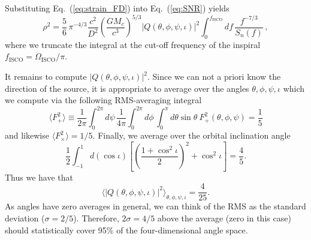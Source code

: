 \documentclass[prd,amsmath,amssymb,aps,floats,amsfonts,notitlepage,superscriptaddress,eqsecnum,nofootinbib,10pt]{revtex4-1}
\newcommand{\f}{\frac}
\newcommand{\be}{\begin{equation}}
\newcommand{\ee}{\end{equation}}
\begin{document}
Substituting Eq.~(\ref{eq:strain_FD}) into Eq.~(\ref{eq:SNR}) yields
%
\be
\rho^2 = \f{5}{6}\, \pi^{-4/3} \f{c^2}{D^2}\left(\f{G M_c}{c^3}\right)^{5/3}|Q(\theta,\phi,\psi,\iota)|^2 \int_0^{f_\text{ISCO}} d f\, \f{f^{-7/3}}{S_n(f)}\, \label{eq:SNR_v2},
\ee
%
where we truncate the integral at the cut-off frequency of the inspiral $f_\text{ISCO}=\Omega_\text{ISCO}/\pi$.

It remains to compute $|Q(\theta,\phi,\psi,\iota)|^2$. 
Since we can not a priori know the direction of the source, it is appropriate to average over the angles $\theta,\phi,\psi,\iota$ which we compute
%
%
via the following RMS-averaging integral
%
\be
\langle F^2_{+}\rangle \equiv \f{1}{2\pi}\int_0^{2\pi}d\psi \,\f{1}{4\pi}\int_0^{2\pi} d\phi\,\int_0^\pi d\theta \sin\theta\ F^2_{+}(\theta,\phi,\psi)=\f{1}{5}\label{eq:ang_av}
\ee
%
and likewise $\langle F^2_{\times}\rangle=1/5 $.
Finally, we average over the orbital inclination angle
%
\be
\f{1}{2} \int_{-1}^1 d(\cos\iota)\left[\left(\f{1+\cos^2\iota}{2}\right)^2+\cos^2\iota\right] = \f{4}{5} .\label{eq:inc_ang_av}
\ee
Thus we have that
%
\be
\langle |Q(\theta,\phi,\psi,\iota)|^2 \rangle_{\theta,\phi,\psi,\iota} = \f{4}{25}\label{eq:RMS_th_ph_ps_iota}.
\ee
%
As angles have zero averages in general, we can think of the RMS as the standard deviation ($\sigma =2/5$). 
Therefore, $2\sigma= 4/5$ above the average (zero in this case) should statistically cover 95\% of the four-dimensional angle space. 
%
%
%
%
%
\end{document}
